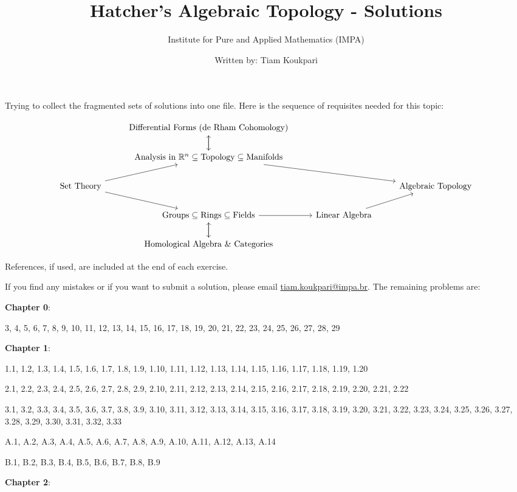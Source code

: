 \documentclass{article}
\title{Hatcher's Algebraic Topology - Solutions}
\author{Institute for Pure and Applied Mathematics (IMPA)}
\date{Written by: Tiam Koukpari}
\newcommand{\R}{\mathbb{R}}
\begin{document}
\maketitle

Trying to collect the fragmented sets of solutions into one file. Here is the sequence of requisites needed for this topic:
\bigskip

\[\begin{tikzcd}
& \textnormal{Differential Forms (de Rham Cohomology)} \arrow[d] & \\
& \textnormal{Analysis in } \R^{n} \subseteq \textnormal{Topology} \subseteq \textnormal{Manifolds} \arrow[rrd] \arrow[u] & \\
\textnormal{Set Theory} \arrow[ru] \arrow[rd] & & & \textnormal{Algebraic Topology} \\
& \textnormal{Groups} \subseteq \textnormal{Rings} \subseteq \textnormal{Fields} \arrow[r]\arrow[d] & \textnormal{Linear Algebra} \arrow[ru] & \\
& \textnormal{Homological Algebra \& Categories} \arrow[u]
\end{tikzcd}\]
\bigskip
\bigskip

References, if used, are included at the end of each exercise.
\medskip

If you find any mistakes or if you want to submit a solution, please email \href{mailto:tiam.koukpari@impa.br}{tiam.koukpari@impa.br}. The remaining problems are:
\medskip

\textbf{Chapter 0}:
\medskip

3, 4, 5, 6, 7, 8, 9, 10, 11, 12, 13, 14, 15, 16, 17, 18, 19, 20, 21, 22, 23, 24, 25, 26, 27, 28, 29
\medskip

\textbf{Chapter 1}:
\medskip

1.1, 1.2, 1.3, 1.4, 1.5, 1.6, 1.7, 1.8, 1.9, 1.10, 1.11, 1.12, 1.13, 1.14, 1.15, 1.16, 1.17, 1.18, 1.19, 1.20

2.1, 2.2, 2.3, 2.4, 2.5, 2.6, 2.7, 2.8, 2.9, 2.10, 2.11, 2.12, 2.13, 2.14, 2.15, 2.16, 2.17, 2.18, 2.19, 2.20, 2.21, 2.22

3.1, 3.2, 3.3, 3.4, 3.5, 3.6, 3.7, 3.8, 3.9, 3.10, 3.11, 3.12, 3.13, 3.14, 3.15, 3.16, 3.17, 3.18, 3.19, 3.20, 3.21, 3.22, 3.23, 3.24, 3.25, 3.26, 3.27, 3.28, 3.29, 3.30, 3.31, 3.32, 3.33

A.1, A.2, A.3, A.4, A.5, A.6, A.7, A.8, A.9, A.10, A.11, A.12, A.13, A.14

B.1, B.2, B.3, B.4, B.5, B.6, B.7, B.8, B.9
\medskip

\textbf{Chapter 2}:
\medskip
\end{document}
